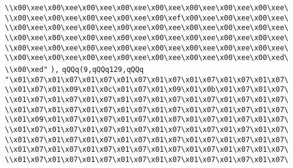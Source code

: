 \verb|\\x00\xee\x00\xee\x00\xee\x00\xee\x00\xee\x00\xee\x00\xee\x00\xee\|\newline
\verb|\\x00\xee\x00\xee\x00\xee\x00\xee\x00\xef\x00\xee\x00\xee\x00\xee\|\newline
\verb|\\x00\xee\x00\xee\x00\xee\x00\xee\x00\xee\x00\xee\x00\xee\x00\xee\|\newline
\verb|\\x00\xee\x00\xee\x00\xee\x00\xee\x00\xee\x00\xee\x00\xee\x00\xee\|\newline
\verb|\\x00\xee\x00\xee\x00\xee\x00\xee\x00\xee\x00\xee\x00\xee\x00\xee\|\newline
\verb|\\x00\xee\x00\xee\x00\xee\x00\xee\x00\xee\x00\xee\x00\xee\x00\xed\|\newline
\verb|\\x00\xed"|\newline
\verb|),|\newline
\verb|qQQq(9,qQQq129,qQQq|\newline
\verb|"\x01\x07\x01\x07\x01\x07\x01\x07\x01\x07\x01\x07\x01\x07\x01\x07\|\newline
\verb|\\x01\x07\x01\x09\x01\x0c\x01\x07\x01\x09\x01\x0b\x01\x07\x01\x07\|\newline
\verb|\\x01\x07\x01\x07\x01\x07\x01\x07\x01\x07\x01\x07\x01\x07\x01\x07\|\newline
\verb|\\x01\x07\x01\x07\x01\x07\x01\x07\x01\x07\x01\x07\x01\x07\x01\x07\|\newline
\verb|\\x01\x09\x01\x07\x01\x07\x01\x07\x01\x07\x01\x07\x01\x07\x01\x07\|\newline
\verb|\\x01\x07\x01\x07\x01\x07\x01\x07\x01\x07\x01\x07\x01\x07\x01\x07\|\newline
\verb|\\x01\x07\x01\x07\x01\x07\x01\x07\x01\x07\x01\x07\x01\x07\x01\x07\|\newline
\verb|\\x01\x07\x01\x07\x01\x07\x01\x07\x01\x07\x01\x07\x01\x07\x01\x07\|\newline
\verb|\\x01\x07\x01\x07\x01\x07\x01\x07\x01\x07\x01\x07\x01\x07\x01\x07\|\newline
